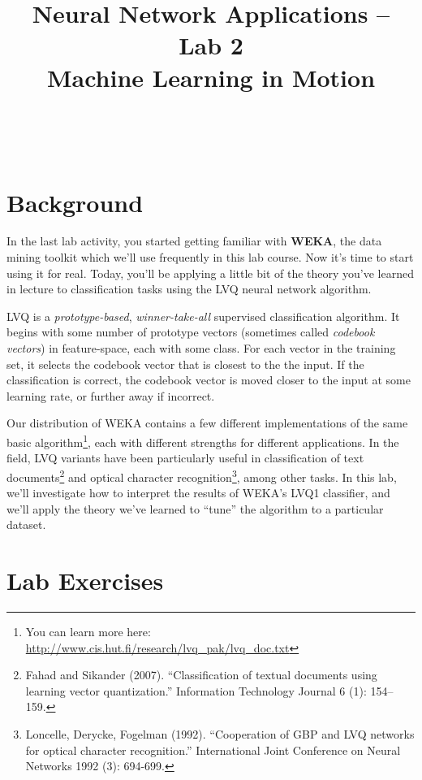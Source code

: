 \documentclass[11pt]{cselabheader}
\title{Neural Network Applications -- Lab 2 \\ Machine Learning in Motion}
\begin{document}
\maketitle

\horrule{0.5pt}\\\horrule{2pt}

\section{Background}

In the last lab activity, you started getting familiar with \textbf{WEKA}, the data mining toolkit which we'll use frequently in this lab course. Now it's time to start using it for real. Today, you'll be applying a little bit of the theory you've learned in lecture to classification tasks using the LVQ neural network algorithm.

LVQ is a \textit{prototype-based}, \textit{winner-take-all} supervised classification algorithm. It begins with some number of prototype vectors (sometimes called \textit{codebook vectors}) in feature-space, each with some class. For each vector in the training set, it selects the codebook vector that is closest to the the input. If the classification is correct, the codebook vector is moved closer to the input at some learning rate, or further away if incorrect.

Our distribution of WEKA contains a few different implementations of the same basic algorithm\footnote{You can learn more here: \url{http://www.cis.hut.fi/research/lvq_pak/lvq_doc.txt}}, each with different strengths for different applications. In the field, LVQ variants have been particularly useful in classification of text documents\footnote{Fahad and Sikander (2007). ``Classification of textual documents using learning vector quantization.'' Information Technology Journal 6 (1): 154–159.} and optical character recognition\footnote{Loncelle, Derycke, Fogelman (1992). ``Cooperation of GBP and LVQ networks for optical character recognition.'' International Joint Conference on Neural Networks 1992 (3): 694-699.}, among other tasks. In this lab, we'll investigate how to interpret the results of WEKA's LVQ1 classifier, and we'll apply the theory we've learned to ``tune'' the algorithm to a particular dataset.

\pagebreak

\section{Lab Exercises}
\end{document}
